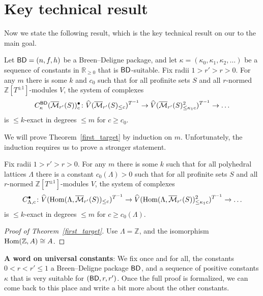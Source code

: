\section{Key technical result}

Now we state the following result, which is the key technical result on our to the main goal.

\begin{theorem}
  \label{first_target}
  \leanok
  Let $\mathsf{BD} = (n,f,h)$ be a Breen--Deligne package,
  and let $\kappa = (\kappa_0, \kappa_1, \kappa_2, \dots)$ be a sequence of constants in $\mathbb R_{\ge 0}$
  that is $\mathsf{BD}$-suitable.
	Fix radii $1>r'>r>0$.
  For any $m$ there is some $k$ and $c_0$ such that for all profinite sets $S$ and all $r$-normed $\mathbb Z[T^{\pm 1}]$-modules $V$,
  the system of complexes
  \[
    C^{\mathsf{BD}}_{\kappa}(\overline{\mathcal M}_{r'}(S))_c^\bullet \colon
    \widehat{V}(\overline{\mathcal M}_{r'}(S)_{\leq c})^{T^{-1}} \to
    \widehat{V}(\overline{\mathcal M}_{r'}(S)_{\leq \kappa_1c}^2)^{T^{-1}}
    \to \ldots
  \]
  is $\leq k$-exact in degrees $\leq m$ for $c\geq c_0$.
\end{theorem}

We will prove Theorem~\ref{first_target} by induction on $m$.
Unfortunately, the induction requires us to prove a stronger statement.

\begin{theorem}
  \label{explicit}
  \leanok
  Fix radii $1>r'>r>0$. For any $m$ there is some $k$
  such that for all polyhedral lattices $\Lambda$
  there is a constant $c_0(\Lambda)>0$
  such that for all profinite sets $S$
  and all $r$-normed $\mathbb Z[T^{\pm 1}]$-modules $V$,
  the system of complexes
  \[
  C_{\Lambda,c}^\bullet \colon
  \widehat{V}(\operatorname{Hom}(\Lambda,\overline{\mathcal M}_{r'}(S))_{\leq c})^{T^{-1}} \to
  \widehat{V}(\operatorname{Hom}(\Lambda,\overline{\mathcal M}_{r'}(S))_{\leq \kappa_1c}^2)^{T^{-1}} \to \ldots
  \]
  is $\leq k$-exact in degrees $\leq m$ for $c\geq c_0(\Lambda)$.
\end{theorem}

\begin{proof}[{Proof of Theorem~\ref{first_target}}]
  \leanok
  Use $\Lambda = \mathbb Z$, and the isomorphism $\operatorname{Hom}(\mathbb Z, A) \cong A$.
\end{proof}

\textbf{A word on universal constants}:
We fix once and for all, the constants $0 < r < r' \le 1$
a Breen--Deligne package $\mathsf{BD}$,
and a sequence of positive constants $\kappa$ that is very suitable for $(\mathsf{BD}, r, r')$.
Once the full proof is formalized,
we can come back to this place and write a bit more about the other constants.

